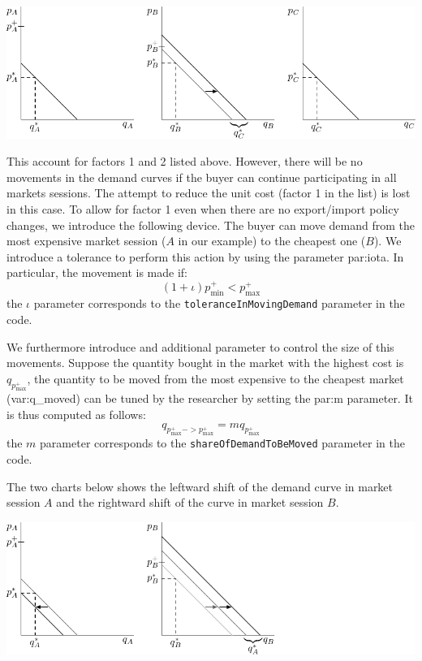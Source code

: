 \documentclass{article}
\begin{document}
\vskip5mm
\hskip-1.5cm
\includegraphics{fig_buying_strategy-1.pdf}

\vskip5mm
 This account for factors 1 and 2 listed above. 
However, there will be no movements in the demand curves if the buyer can continue participating in all markets sessions. The attempt to reduce the unit cost (factor 1 in the list) is lost in this case. To allow for factor 1 even when there are no export/import policy changes, we introduce the following device. The buyer can move demand from the most expensive market session ($A$ in our example) to the cheapest one ($B$). We introduce a tolerance to perform this action by using the parameter \gls{par:iota}. In particular, the movement is made if:
\[(1+\iota)p^+_{\min}<p^+_{\max}\]
the $\iota$ parameter corresponds to the \verb+toleranceInMovingDemand+ parameter in the code.

We furthermore introduce and additional parameter to control the size of this movements. Suppose the quantity bought in the market with the highest cost is $q_{p^+_{\max}}$, the quantity to be moved from the most expensive to the cheapest market (\gls{var:q_moved}) can be tuned by the researcher by setting the \gls{par:m} parameter. It is thus computed as follows:
\[
	q_{p^+_{\max} -> p^+_{\max}}=mq_{p^+_{\max}}
\]
the $m$ parameter corresponds to the \verb+shareOfDemandToBeMoved+ parameter in the code.

The two charts below shows the leftward shift of the demand curve in market session $A$ and the rightward shift of the curve in market session $B$.     

\vskip5mm
\hskip-1.5cm
\includegraphics{fig_buying_strategy-2.pdf}
\vskip5mm
\end{document}
